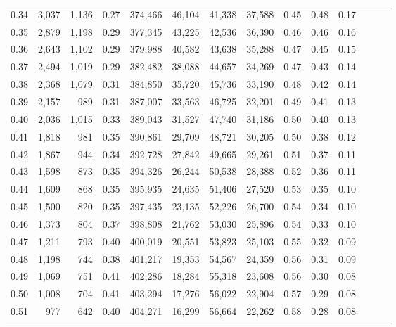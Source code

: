 \begin{tabular}{rrrrrrrrrrrrrr}
0.34 &   3,037 &  1,136 &  0.27 &  374,466 &   46,104 &  41,338 &  37,588 &  0.45 &  0.48 &      0.17 \\
0.35 &   2,879 &  1,198 &  0.29 &  377,345 &   43,225 &  42,536 &  36,390 &  0.46 &  0.46 &      0.16 \\
0.36 &   2,643 &  1,102 &  0.29 &  379,988 &   40,582 &  43,638 &  35,288 &  0.47 &  0.45 &      0.15 \\
0.37 &   2,494 &  1,019 &  0.29 &  382,482 &   38,088 &  44,657 &  34,269 &  0.47 &  0.43 &      0.14 \\
0.38 &   2,368 &  1,079 &  0.31 &  384,850 &   35,720 &  45,736 &  33,190 &  0.48 &  0.42 &      0.14 \\
0.39 &   2,157 &    989 &  0.31 &  387,007 &   33,563 &  46,725 &  32,201 &  0.49 &  0.41 &      0.13 \\
0.40 &   2,036 &  1,015 &  0.33 &  389,043 &   31,527 &  47,740 &  31,186 &  0.50 &  0.40 &      0.13 \\
0.41 &   1,818 &    981 &  0.35 &  390,861 &   29,709 &  48,721 &  30,205 &  0.50 &  0.38 &      0.12 \\
0.42 &   1,867 &    944 &  0.34 &  392,728 &   27,842 &  49,665 &  29,261 &  0.51 &  0.37 &      0.11 \\
0.43 &   1,598 &    873 &  0.35 &  394,326 &   26,244 &  50,538 &  28,388 &  0.52 &  0.36 &      0.11 \\
0.44 &   1,609 &    868 &  0.35 &  395,935 &   24,635 &  51,406 &  27,520 &  0.53 &  0.35 &      0.10 \\
0.45 &   1,500 &    820 &  0.35 &  397,435 &   23,135 &  52,226 &  26,700 &  0.54 &  0.34 &      0.10 \\
0.46 &   1,373 &    804 &  0.37 &  398,808 &   21,762 &  53,030 &  25,896 &  0.54 &  0.33 &      0.10 \\
0.47 &   1,211 &    793 &  0.40 &  400,019 &   20,551 &  53,823 &  25,103 &  0.55 &  0.32 &      0.09 \\
0.48 &   1,198 &    744 &  0.38 &  401,217 &   19,353 &  54,567 &  24,359 &  0.56 &  0.31 &      0.09 \\
0.49 &   1,069 &    751 &  0.41 &  402,286 &   18,284 &  55,318 &  23,608 &  0.56 &  0.30 &      0.08 \\
0.50 &   1,008 &    704 &  0.41 &  403,294 &   17,276 &  56,022 &  22,904 &  0.57 &  0.29 &      0.08 \\
0.51 &     977 &    642 &  0.40 &  404,271 &   16,299 &  56,664 &  22,262 &  0.58 &  0.28 &      0.08 \\

\end{tabular}
